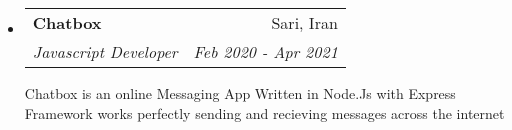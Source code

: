 \documentclass[A4,11pt]{article}
\makeatletter
\newcommand{\resumeItem}[2]{
  \item{
    \textbf{#1}{: #2 \vspace{-2pt}}
  }
}
\newcommand{\resumeProjectItem}[1]{
  \item{
    { #1 \vspace{-2pt}}
  }
}
\newcommand{\resumeSubheading}[4]{
  \vspace{-1pt}\item
    \begin{tabular*}{0.97\textwidth}[t]{l@{\extracolsep{\fill}}r}
      \textbf{#1} & #2 \\
      \textit{#3} & \textit{\small #4} \\
    \end{tabular*}\vspace{-5pt}
}
\newcommand{\resumeSubItem}[2]{\resumeItem{#1}{#2}\vspace{-4pt}}
\newcommand{\resumeSubHeadingListStart}{\begin{itemize}[leftmargin=*]}
\newcommand{\resumeSubHeadingListEnd}{\end{itemize}}
\newcommand{\resumeItemListStart}{\begin{itemize}}
\newcommand{\resumeItemListEnd}{\end{itemize}\vspace{-5pt}}
\makeatother
\begin{document}
   \resumeSubHeadingListStart
    \resumeSubheading
      {Chatbox}{Sari, Iran}
      {Javascript Developer}{Feb 2020 - Apr 2021}

     \vspace{10pt}
     
     { Chatbox is an online Messaging App Written in Node.Js with Express Framework works perfectly sending and recieving messages across the internet }


\begin{comment}
	 \subsection*{Technologies}
	\vspace{-10pt}
	\resumeItemListStart
        \resumeProjectItem{ \textbf{React Navigation} for Transfer between pages}
        \resumeProjectItem{Redux for theming and storing global variables}
        \resumeProjectItem{ \textbf{Axios} for sending ajax requests}
	\resumeProjectItem{Style components for design custom components}
	\resumeProjectItem{Sequelize for database modeling and creation}
	\resumeProjectItem{ \textbf{Passport} for admin authentication}
	
      \resumeItemListEnd



   \subsection*{Achievements}
	\vspace{-10pt}
	\resumeItemListStart
       \resumeProjectItem{ability for users to sign up with their phone number}
        \resumeProjectItem{create my own Latex to Json Converter}
        \resumeProjectItem{Add thousand Items in Database with json ?le uploading}
      \resumeItemListEnd
\end{comment}
   \resumeSubHeadingListEnd

\end{document}
